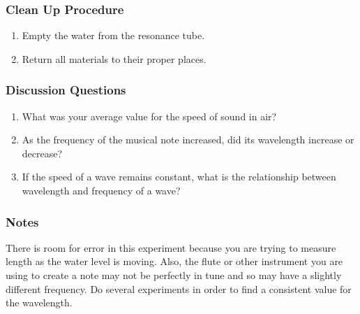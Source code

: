 \subsubsection*{Clean Up Procedure}
\begin{enumerate}
\item{Empty the water from the resonance tube.} 
\item{Return all materials to their proper places.} 
\end{enumerate}

\subsubsection*{Discussion Questions}
\begin{enumerate}
\item{What was your average value for the speed of sound in air?}
\item{As the frequency of the musical note increased, did its wavelength increase or decrease?}
\item{If the speed of a wave remains constant, what is the relationship between wavelength and frequency of a wave?}
\end{enumerate}

\subsubsection*{Notes}
There is room for error in this experiment because you are trying to measure length as the water level is moving. Also, the flute or other instrument you are using to create a note may not be perfectly in tune and so may have a slightly different frequency. Do several experiments in order to find a consistent value for the wavelength.

